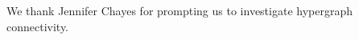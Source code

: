  We thank Jennifer Chayes for prompting us to investigate  hypergraph connectivity.
% 
%
%
%
%
%



